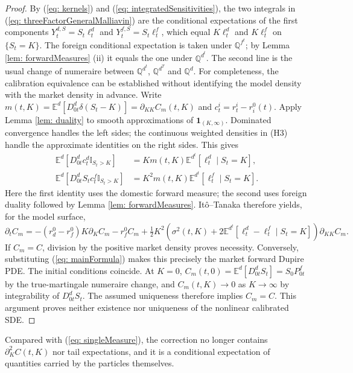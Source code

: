 \begin{proof}
By (\ref{eq: kernels}) and (\ref{eq: integratedSensitivities}), the two integrals in (\ref{eq: threeFactorGeneralMalliavin}) are the conditional expectations of the first components $Y^{d,S}_t=S_t\ell^d_t$ and $Y^{f,S}_t=S_t\ell^f_t$, which equal $K\ell^d_t$ and $K\ell^f_t$ on $\{S_t=K\}$. The foreign conditional expectation is taken under $\mathbb{Q}^{f^t}$; by Lemma \ref{lem: forwardMeasures} (ii) it equals the one under $\mathbb{Q}^{d^t}$. The second line is the usual change of numeraire between $\mathbb{Q}^{d^t}$, $\mathbb{Q}^{d^T}$ and $\mathbb{Q}^d$.
For completeness, the calibration equivalence can be established without
identifying the model density with the market density in advance. Write
$m(t,K)=\mathbb E^d[D^d_{0t}\delta(S_t-K)]=\partial_{KK}C_m(t,K)$ and
$c^i_t=r^i_t-r_i^0(t)$. Apply Lemma \ref{lem: duality} to smooth approximations of
$\mathbf1_{(K,\infty)}$. Dominated convergence handles the left sides;
the continuous weighted densities in (H3) handle the approximate identities
on the right sides. This gives
\begin{align*}
\mathbb E^d[D^d_{0t}c^d_t\mathbb I_{S_t>K}]
 &=K m(t,K)\mathbb E^{d^t}[\ell^d_t\mid S_t=K],\\
\mathbb E^d[D^d_{0t}S_tc^f_t\mathbb I_{S_t>K}]
 &=K^2m(t,K)\mathbb E^{d^t}[\ell^f_t\mid S_t=K].
\end{align*}
Here the first identity uses the domestic forward measure; the second uses
foreign duality followed by Lemma \ref{lem: forwardMeasures}. It\^o--Tanaka
therefore yields, for the model surface,
\[
\partial_t C_m=-(r_d^0-r_f^0)K\partial_K C_m-r_f^0C_m
+\tfrac12K^2\left(\sigma^2(t,K)+2\mathbb E^{d^t}
[\ell^d_t-\ell^f_t\mid S_t=K]\right)\partial_{KK}C_m.
\]
If $C_m=C$, division by the positive market density proves necessity.
Conversely, substituting (\ref{eq: mainFormula}) makes this precisely the
market forward Dupire PDE. The initial conditions coincide. At $K=0$,
$C_m(t,0)=\mathbb E^d[D^d_{0t}S_t]=S_0P^f_{0t}$ by the true-martingale
numeraire change, and $C_m(t,K)\to0$ as $K\to\infty$ by integrability of
$D^d_{0t}S_t$. The assumed uniqueness therefore implies $C_m=C$. This argument proves neither existence
nor uniqueness of the nonlinear calibrated SDE.

\end{proof}
Compared with (\ref{eq: singleMeasure}), the correction no longer contains $\partial^2_KC(t,K)$ nor tail expectations, and it is a conditional expectation of quantities carried by the particles themselves.
